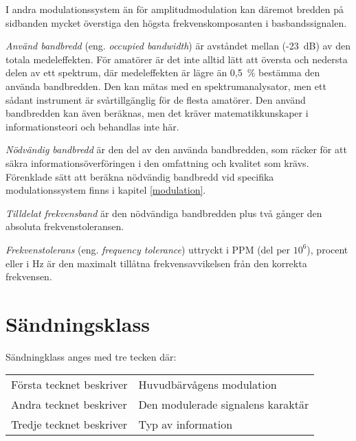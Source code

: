 I andra modulationssystem än för amplitudmodulation kan däremot bredden på
sidbanden mycket överstiga den högsta frekvenskomposanten i basbandssignalen.

\emph{Använd bandbredd} (eng. \emph{occupied bandwidth}) är avståndet mellan
(-23~dB) av den totala medeleffekten.
För amatörer är det inte alltid lätt att översta och nedersta delen av ett
spektrum, där medeleffekten är lägre än 0,5~\% bestämma den använda bandbredden.
Den kan mätas med en spektrumanalysator, men ett sådant instrument är
svårtillgänglig för de flesta amatörer.
Den använd bandbredden kan även beräknas, men det kräver matematikkunskaper i
informationsteori och behandlas inte här.

\emph{Nödvändig bandbredd} är den del av den använda bandbredden, som räcker
för att säkra informationsöverföringen i den omfattning och kvalitet som krävs.
Förenklade sätt att beräkna nödvändig bandbredd vid specifika modulationssystem
finns i kapitel \ref{modulation}.

\emph{Tilldelat frekvensband} är den nödvändiga bandbredden plus två gånger den
absoluta frekvenstoleransen.

\emph{Frekvenstolerans} (eng. \emph{frequency tolerance}) uttryckt i PPM (del per
\(10^6\)), procent eller i Hz är den maximalt tillåtna frekvensavvikelsen från
den korrekta frekvensen.

\section{Sändningsklass}
Sändningklass anges med tre tecken där:\\
\begin{tabular}{ll}
	Första tecknet beskriver &  Huvudbärvågens modulation \\
	Andra tecknet beskriver & Den modulerade signalens karaktär \\
	Tredje tecknet beskriver & Typ av information \\
\end{tabular}

